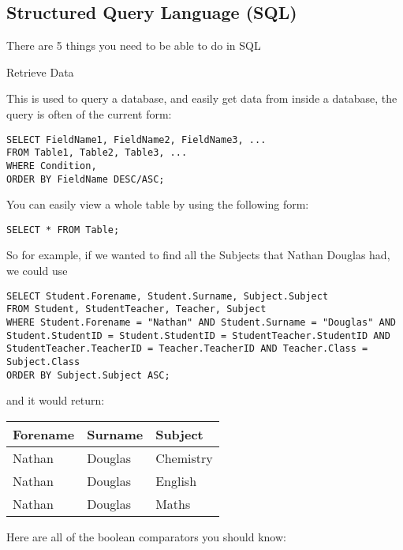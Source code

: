 \subsection{Structured Query Language (SQL)}

There are 5 things you need to be able to do in SQL

Retrieve Data

This is used to query a database, and easily get data from inside a database, the query is often of the current form:
\begin{verbatim}
SELECT FieldName1, FieldName2, FieldName3, ...
FROM Table1, Table2, Table3, ...
WHERE Condition,
ORDER BY FieldName DESC/ASC;
\end{verbatim}

You can easily view a whole table by using the following form:

\begin{verbatim}
SELECT * FROM Table;
\end{verbatim}

So for example, if we wanted to find all the Subjects that Nathan Douglas had, we could use

\begin{verbatim}
SELECT Student.Forename, Student.Surname, Subject.Subject
FROM Student, StudentTeacher, Teacher, Subject
WHERE Student.Forename = "Nathan" AND Student.Surname = "Douglas" AND Student.StudentID = Student.StudentID = StudentTeacher.StudentID AND StudentTeacher.TeacherID = Teacher.TeacherID AND Teacher.Class = Subject.Class
ORDER BY Subject.Subject ASC;
\end{verbatim}

and it would return:

\begin{table}[H]
	\begin{tabular}{| l | l | l |}\hline
		Forename & Surname & Subject \\\hline
		Nathan & Douglas & Chemistry \\\hline
		Nathan & Douglas & English \\\hline
		Nathan & Douglas & Maths \\\hline
	\end{tabular}
\end{table}

Here are all of the boolean comparators you should know:

